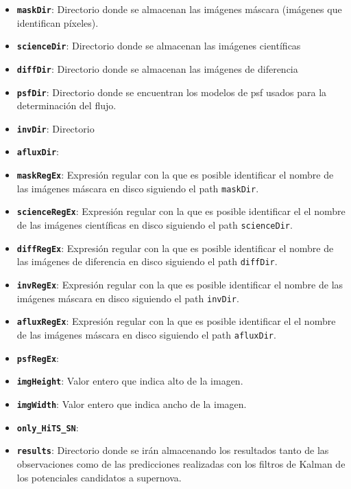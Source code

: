 \begin{itemize}
\item \textbf{\texttt{maskDir}}: Directorio donde se almacenan las im\'agenes m\'ascara (im\'agenes que identifican p\'ixeles).
\item \textbf{\texttt{scienceDir}}: Directorio donde se almacenan las im\'agenes cient\'ificas 
\item \textbf{\texttt{diffDir}}: Directorio donde se almacenan las im\'agenes de diferencia 
\item \textbf{\texttt{psfDir}}: Directorio donde se encuentran los modelos de psf usados para la determinaci\'on del flujo.
\item \textbf{\texttt{invDir}}: Directorio 
\item \textbf{\texttt{afluxDir}}:
\item \textbf{\texttt{maskRegEx}}: Expresi\'on regular con la que es posible identificar el nombre de las im\'agenes m\'ascara en disco siguiendo el path \texttt{maskDir}.
\item \textbf{\texttt{scienceRegEx}}: Expresi\'on regular con la que es posible identificar el el nombre de las im\'agenes cient\'ificas en disco siguiendo el path \texttt{scienceDir}.
\item \textbf{\texttt{diffRegEx}}: Expresi\'on regular con la que es posible identificar el nombre de las im\'agenes de diferencia en disco siguiendo el path \texttt{diffDir}.
\item \textbf{\texttt{invRegEx}}: Expresi\'on regular con la que es posible identificar el nombre de las im\'agenes m\'ascara en disco siguiendo el path \texttt{invDir}.
\item \textbf{\texttt{afluxRegEx}}: Expresi\'on regular con la que es posible identificar el el nombre de las im\'agenes m\'ascara en disco siguiendo el path \texttt{afluxDir}.
\item \textbf{\texttt{psfRegEx}}:
\item \textbf{\texttt{imgHeight}}: Valor entero que indica alto de la imagen.
\item \textbf{\texttt{imgWidth}}: Valor entero que indica ancho de la imagen.
\item \textbf{\texttt{only\_HiTS\_SN}}: 
\item \textbf{\texttt{results}}: Directorio donde se ir\'an almacenando los resultados tanto de las observaciones como de las predicciones realizadas con los filtros de Kalman de los potenciales candidatos a supernova.
\end{itemize}

